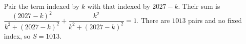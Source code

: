Pair the term indexed by $k$ with that indexed by $2027-k$. Their sum is $\dfrac{(2027-k)^2}{k^2+(2027-k)^2}+\dfrac{k^2}{k^2+(2027-k)^2}=1$. There are $1013$ pairs and no fixed index, so $\boxed{S=1013}$.
